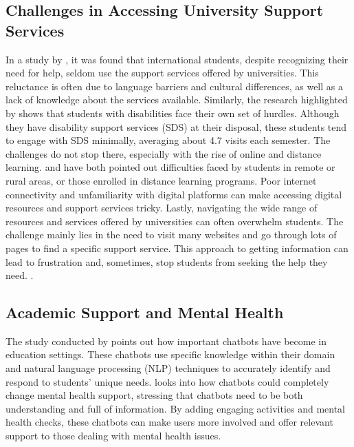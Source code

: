 \documentclass{l4proj}
\begin{document}
\subsection{Challenges in Accessing University Support Services}

In a study by \cite{Harryba2022Understanding}, it was found that international students, despite recognizing their need for help, seldom use the support services offered by universities. This reluctance is often due to language barriers and cultural differences, as well as a lack of knowledge about the services available. Similarly, the research highlighted by \cite{Abreu2016StudentExperiences} shows that students with disabilities face their own set of hurdles. Although they have disability support services (SDS) at their disposal, these students tend to engage with SDS minimally, averaging about 4.7 visits each semester.  The challenges do not stop there, especially with the rise of online and distance learning. \cite{ArkoAchemfuor2017StudentSupport} and \cite{WalkerGibbs2016ViewThrough} have both pointed out difficulties faced by students in remote or rural areas, or those enrolled in distance learning programs. Poor internet connectivity and unfamiliarity with digital platforms can make accessing digital resources and support services tricky. Lastly, navigating the wide range of resources and services offered by universities can often overwhelm students. The challenge mainly lies in the need to visit many websites and go through lots of pages to find a specific support service. This approach to getting information can lead to frustration and, sometimes, stop students from seeking the help they need. \citep{Harryba2022Understanding}.



\subsection{Academic Support and Mental Health}

The study conducted by \cite{patel2023enhancing} points out how important chatbots have become in education settings. These chatbots use specific knowledge within their domain and natural language
processing (NLP) techniques to accurately identify and respond to students’ unique needs. \cite{potts2021chatbots} looks into how chatbots could completely change mental health support, stressing that chatbots need to be both understanding and full of information. By adding engaging activities and mental health checks, these chatbots can make users more involved and offer relevant support to those dealing with mental health issues.
\end{document}
